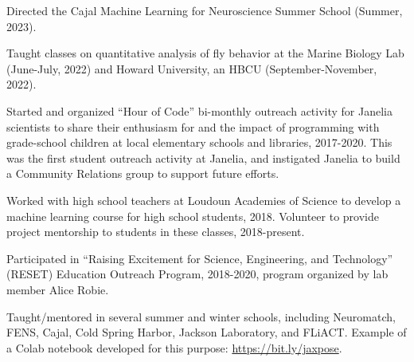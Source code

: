 \documentclass[11pt, letterpaper]{awesome-cv}
\begin{document}
\vspace{\acvSectionContentTopSkip}
\vspace{2mm}

\begin{cvitems}
\item Directed the Cajal Machine Learning for Neuroscience Summer School (Summer, 2023). 
\item Taught classes on quantitative analysis of fly behavior at the Marine Biology Lab (June-July, 2022) and Howard University, an HBCU (September-November, 2022). 
\item Started and organized ``Hour of Code'' bi-monthly outreach activity for Janelia scientists to share their enthusiasm for and the impact of programming with grade-school children at local elementary schools and libraries, 2017-2020. This was the first student outreach activity at Janelia, and instigated Janelia to build a Community Relations group to support future efforts. 
\item Worked with high school teachers at Loudoun Academies of Science to develop a machine learning course for high school students, 2018. Volunteer to provide project mentorship to students in these classes, 2018-present.
\item Participated in ``Raising Excitement for Science, Engineering, and Technology'' (RESET) Education Outreach Program, 2018-2020, program organized by lab member Alice Robie. 
\item Taught/mentored in several summer and winter schools, including Neuromatch, FENS, Cajal, Cold Spring Harbor, Jackson Laboratory, and FLiACT. Example of a Colab notebook developed for this purpose: \url{https://bit.ly/jaxpose}.
\end{cvitems}
\vspace{\acvSectionContentTopSkip}


\vspace{\acvSectionContentTopSkip}
\vspace{2mm}

\end{document}

